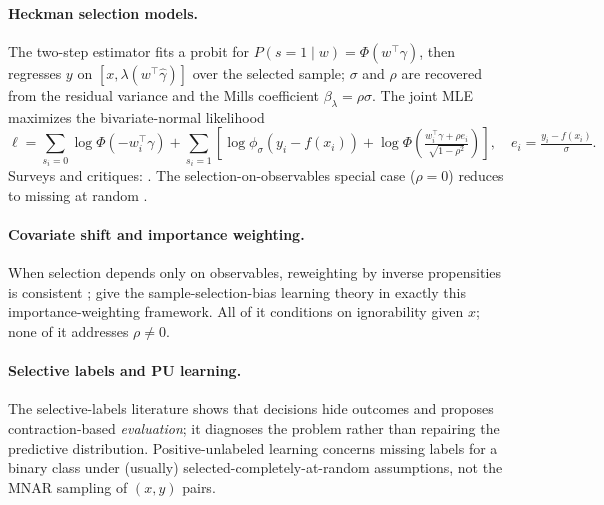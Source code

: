 \documentclass[10pt]{article}
\newcommand{\IMR}{\lambda}
\begin{document}
\paragraph{Heckman selection models.} The two-step estimator
\citep{heckman1979} fits a probit for $P(s{=}1 \mid w) = \Phi(w^\top
\gamma)$, then regresses $y$ on $[x, \IMR(w^\top\hat\gamma)]$ over the
selected sample; $\sigma$ and $\rho$ are recovered from the residual
variance and the Mills coefficient $\beta_\IMR = \rho\sigma$. The joint
MLE maximizes the bivariate-normal likelihood
\begin{equation}
\ell = \sum_{s_i=0}\log\Phi(-w_i^\top\gamma)
+ \sum_{s_i=1}\left[\log\phi_\sigma(y_i - f(x_i)) +
\log\Phi\!\left(\tfrac{w_i^\top\gamma + \rho e_i}
{\sqrt{1-\rho^2}}\right)\right],\quad e_i = \tfrac{y_i - f(x_i)}{\sigma}.
\label{eq:ll}
\end{equation}
Surveys and critiques: \citet{vella1998,puhani2000,winship1992}. The
selection-on-observables special case ($\rho = 0$) reduces to missing at
random \citep{rubin1976,little2002}.

\paragraph{Covariate shift and importance weighting.} When selection
depends only on observables, reweighting by inverse propensities is
consistent \citep{shimodaira2000,sugiyama2007}; \citet{cortes2008} give
the sample-selection-bias learning theory in exactly this
importance-weighting framework. All of it conditions on ignorability
given $x$; none of it addresses $\rho \neq 0$.

\paragraph{Selective labels and PU learning.} The selective-labels
literature \citep{lakkaraju2017} shows that decisions hide outcomes and
proposes contraction-based \emph{evaluation}; it diagnoses the problem
rather than repairing the predictive distribution. Positive-unlabeled
learning \citep{elkan2008,bekker2020} concerns missing labels for a
binary class under (usually) selected-completely-at-random assumptions,
not the MNAR sampling of $(x, y)$ pairs.
\end{document}

